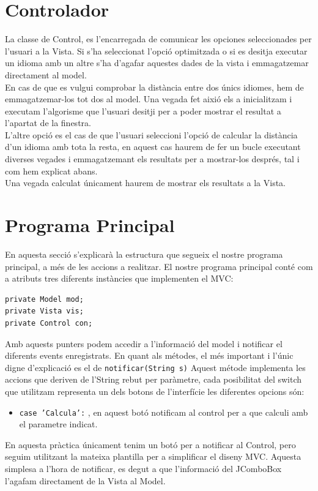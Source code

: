 \documentclass[conference]{IEEEtran}
\begin{document}
\section{Controlador}
La classe de Control, es l'encarregada de comunicar les opciones seleccionades per l'usuari a la Vista. Si s'ha seleccionat l'opció optimitzada o si es desitja executar un idioma amb un altre s'ha d'agafar aquestes dades de la vista i emmagatzemar directament al model. \\
En cas de que es vulgui comprobar la distància entre dos únics idiomes, hem de emmagatzemar-los tot dos al model. Una vegada fet aixió els a inicialitzam i executam l'algorisme que l'usuari desitji per a poder mostrar el resultat a l'apartat de la finestra.\\
L'altre opció es el cas de que l'usuari seleccioni l'opció de calcular la distància d'un idioma amb tota la resta, en aquest cas haurem de fer un bucle executant diverses vegades i emmagatzemant els resultats per a mostrar-los després, tal i com hem explicat abans.
\\ Una vegada calculat únicament haurem de mostrar els resultats a la Vista.

\section{Programa Principal}
 En aquesta secció s'explicarà la estructura que segueix el nostre programa principal, a més de les accions a realitzar. El nostre programa principal conté com a atributs tres diferents instàncies que implementen el MVC:
\begin{verbatim}
private Model mod;
private Vista vis;
private Control con;
\end{verbatim}
    Amb aquests punters podem accedir a l'informació del model i notificar el diferents events enregistrats. En quant als métodes, el més important i l'únic digne d'explicació es el de \texttt{notificar(String s)} Aquest métode implementa les accions que deriven de l'String rebut per paràmetre, cada posibilitat del switch que utilitzam representa un dels botons de l'interfície les diferentes opcions són:
    \begin{itemize}
        \
        \item \texttt{case 'Calcula':} , en aquest botó notificam al control per a que calculi amb el parametre indicat.\\
    \end{itemize}
    En aquesta pràctica únicament tenim un botó per a notificar al Control, pero seguim utilitzant la mateixa plantilla per a simplificar el diseny MVC. Aquesta simplesa a l'hora de notificar, es degut a que l'informació del JComboBox l'agafam directament de la Vista al Model.
\end{document}

